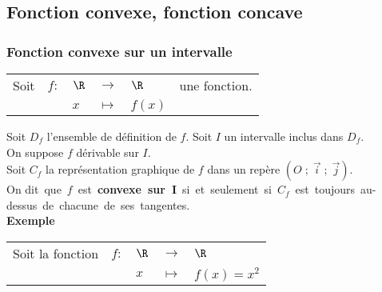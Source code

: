 \newpage

\subsection{Fonction convexe, fonction concave}

\subsubsection{Fonction convexe sur un intervalle}

\begin{tabular}{llllll}
\hspace{-.3cm} Soit & $f:$ & $\R$ & $\longrightarrow$ & $\R$ & une fonction. \\
& & $x$ & $\longmapsto$ & $f(x)$ & \\
\end{tabular}

\vspace*{.3cm}

Soit $D_f$ l'ensemble de définition de $f$. Soit $I$ un intervalle inclus dans $D_f$. \\

On suppose $f$ dérivable sur $I$. \\

Soit $C_f$ la représentation graphique de $f$ dans un repère $\left(O \; ; \; \overrightarrow{i} \; ; \; \overrightarrow{j}\right)$. \\

On \hbox{dit que $f$ est \textbf{convexe sur I} si et seulement si $C_f$ est toujours au-dessus de chacune de ses tangentes.} \\

\textbf{Exemple} \\

\begin{tabular}{lllll}
\hspace{-.3cm} Soit la fonction & $f:$ & $\R$ & $\longrightarrow$ & $\R$ \\
& & $x$ & $\longmapsto$ & $f(x) = x^2$ \\
\end{tabular}

\vspace*{.3cm}

